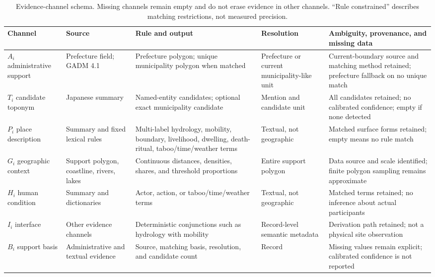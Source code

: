 \documentclass[9pt,twocolumn,a4paper]{extarticle}
\begin{document}
\begin{table}[t]
\centering
\small
\setlength{\tabcolsep}{4pt}
\begin{tabular}{p{}p{}p{}p{}p{}}
\toprule
Channel & Source & Rule and output & Resolution & Ambiguity, provenance, and missing data \\
\midrule
\(A_i\) administrative support & Prefecture field; GADM 4.1 & Prefecture polygon; unique municipality polygon when matched & Prefecture or current municipality-like unit & Current-boundary source and matching method retained; prefecture fallback on no unique match \\
\(T_i\) candidate toponym & Japanese summary & Named-entity candidates; optional exact municipality candidate & Mention and candidate unit & All candidates retained; no calibrated confidence; empty if none detected \\
\(P_i\) place description & Summary and fixed lexical rules & Multi-label hydrology, mobility, boundary, livelihood, dwelling, death-ritual, taboo/time/weather terms & Textual, not geographic & Matched surface forms retained; empty means no rule match \\
\(G_i\) geographic context & Support polygon, coastline, rivers, lakes & Continuous distances, densities, shares, and threshold proportions & Entire support polygon & Data source and scale identified; finite polygon sampling remains approximate \\
\(H_i\) human condition & Summary and dictionaries & Actor, action, or taboo/time/weather terms & Textual, not geographic & Matched terms retained; no inference about actual participants \\
\(I_i\) interface & Other evidence channels & Deterministic conjunctions such as hydrology with mobility & Record-level semantic metadata & Derivation path retained; not a physical site observation \\
\(B_i\) support basis & Administrative and textual evidence & Source, matching basis, resolution, and candidate count & Record & Missing values remain explicit; calibrated confidence is not reported \\
\bottomrule
\end{tabular}
\caption{Evidence-channel schema. Missing channels remain empty and do not erase evidence in other channels. ``Rule constrained'' describes matching restrictions, not measured precision.}
\label{tab:model}
\end{table}
\end{document}
